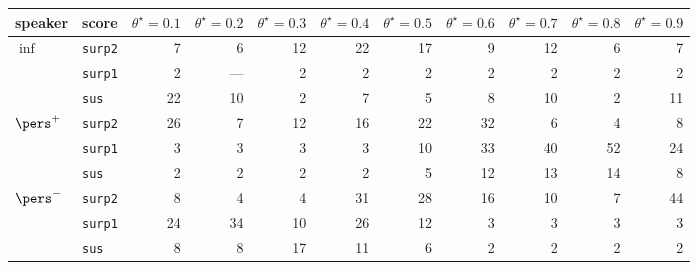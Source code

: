 \begin{tabular}{llrrrrrrrrr}
\toprule
speaker & score & $\theta^\star=0.1$ & $\theta^\star=0.2$ & $\theta^\star=0.3$ & $\theta^\star=0.4$ & $\theta^\star=0.5$ & $\theta^\star=0.6$ & $\theta^\star=0.7$ & $\theta^\star=0.8$ & $\theta^\star=0.9$ \\
\midrule
$\inf$ & \texttt{surp2} & 7 & 6 & 12 & 22 & 17 & 9 & 12 & 6 & 7 \\
 & \texttt{surp1} & 2 & --- & 2 & 2 & 2 & 2 & 2 & 2 & 2 \\
 & \texttt{sus} & 22 & 10 & 2 & 7 & 5 & 8 & 10 & 2 & 11 \\
\midrule
$\pers^{+}$ & \texttt{surp2} & 26 & 7 & 12 & 16 & 22 & 32 & 6 & 4 & 8 \\
 & \texttt{surp1} & 3 & 3 & 3 & 3 & 10 & 33 & 40 & 52 & 24 \\
 & \texttt{sus} & 2 & 2 & 2 & 2 & 5 & 12 & 13 & 14 & 8 \\
\midrule
$\pers^{-}$ & \texttt{surp2} & 8 & 4 & 4 & 31 & 28 & 16 & 10 & 7 & 44 \\
 & \texttt{surp1} & 24 & 34 & 10 & 26 & 12 & 3 & 3 & 3 & 3 \\
 & \texttt{sus} & 8 & 8 & 17 & 11 & 6 & 2 & 2 & 2 & 2 \\
\bottomrule
\end{tabular}
